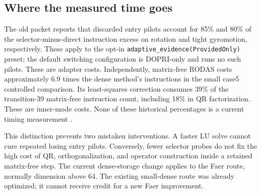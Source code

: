 \documentclass[aps,prd,reprint,amsmath,amssymb,longbibliography,nofootinbib]{revtex4-2}
\newcommand{\code}[1]{\texttt{#1}}
\begin{document}
\subsection{Where the measured time goes}
The old packet reports that discarded entry pilots account for 85\% and 80\% of the selector-minus-direct instruction excess on rotation and tight gyromotion, respectively. These apply to the opt-in \code{adaptive\_evidence(ProvidedOnly)} preset; the default switching configuration is DOPRI-only and runs no such pilots. These are adapter costs. Independently, matrix-free RODAS costs approximately 6.9 times the dense method's instructions in the small case5 controlled comparison. Its least-squares correction consumes 39\% of the transition-39 matrix-free instruction count, including 18\% in QR factorization. These are inner-mode costs. None of these historical percentages is a current timing measurement \cite{ProfilePacket}.

This distinction prevents two mistaken interventions. A faster LU solve cannot cure repeated losing entry pilots. Conversely, fewer selector probes do not fix the high cost of QR, orthogonalization, and operator construction inside a retained matrix-free step. The current dense-storage change applies to the Faer route, normally dimension above 64. The existing small-dense route was already optimized; it cannot receive credit for a new Faer improvement.
\end{document}
